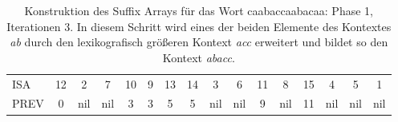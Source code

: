 \begin{table}[H]
\begin{adjustbox}{max width=\textwidth}
\begin{tabular}{lccccccccccccccc}
\multicolumn{1}{l|}{ISA}     & 12                      & 2   & \cellcolor[HTML]{\red}7 & 10 & 9                         & 13                                              & 14                                                 & 3                       & \cellcolor[HTML]{\red}6 & 11 & 8                       & 15  & 4   & 5   & 1   \\
\multicolumn{1}{l|}{PREV}    & 0                       & nil & nil                       & 3  & \cellcolor[HTML]{\red}3 & 5                                               & 5                                                  & nil                     & nil                       & 9  & nil                     & 11  & nil & nil & nil
\end{tabular}
\end{adjustbox}

\caption[Konstruktion des Suffix Arrays für das Wort caabaccaabacaa: Phase 1, Iterationen 3]{Konstruktion des Suffix Arrays für das Wort caabaccaabacaa: Phase 1, Iterationen 3. In diesem Schritt wird eines der beiden Elemente des Kontextes \textit{ab} durch den lexikografisch größeren Kontext \textit{acc} erweitert und bildet so den Kontext \textit{abacc}.}
\label{table_complex_example_1_3} 
\end{table}

